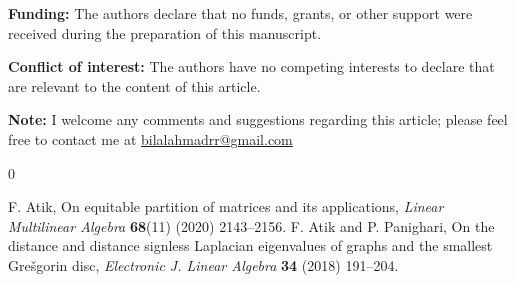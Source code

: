 \documentclass[12pt,twoside]{article}
\begin{document}
\noindent \textbf{Funding:} The authors declare that no funds, grants, or other support were received during the preparation of this manuscript.

\noindent \textbf{Conflict of interest:} The authors have no competing interests to declare that are relevant to the content of this article.

\noindent\textbf{Note:} I welcome any comments and suggestions regarding this article; please feel free to contact me at \href{bilalahmadrr@gmail.com}{bilalahmadrr@gmail.com}



\begin{thebibliography}{0}

	F. Atik, On equitable partition of matrices and its applications, \emph{Linear Multilinear Algebra} \textbf{68}(11) (2020) 2143--2156.
  {F. Atik and P. Panighari, On the distance and distance signless Laplacian eigenvalues of graphs and the smallest Gre\v{s}gorin disc, \em Electronic J. Linear Algebra} {\bf 34} (2018) 191--204.


\end{thebibliography}
\end{document}
